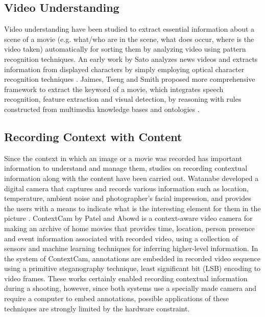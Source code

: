 \subsection{Video Understanding}

Video understanding have been studied to extract essential information about a scene of a movie (e.g. what/who are in the scene, what does occur, where is the video taken) automatically for sorting them by analyzing video using pattern recognition techniques.
An early work by Sato analyzes news videos and extracts information from displayed characters by simply employing optical character recognition techniques \cite{sato1998video}.
Jaimes, Tseng and Smith proposed more comprehensive framework to extract the keyword of a movie, which integrates speech recognition, feature extraction and visual detection, by reasoning with rules constructed from multimedia knowledge bases and ontologies \cite{jaimes2003modal}.

\subsection{Recording Context with Content}
Since the context in which an image or a movie was recorded has important information to understand and manage them, studies on recording contextual information along with the content have been carried out.
Watanabe developed a digital camera that captures and records various information such as location, temperature, ambient noise and photographer's facial impression, and provides the users with a means to indicate what is the interesting element for them in the picture \cite{Watanabe:2007:WDC:1240866.1241073}.
ContextCam by Patel and Abowd \cite{Patel04thecontextcam:} is a context-aware video camera for making an archive of home movies that provides time, location, person presence and event information associated with recorded video, using a collection of sensors and machine learning techniques for inferring higher-level information.
In the system of ContextCam, annotations are embedded in recorded video sequence using a primitive steganography technique, least significant bit (LSB) encoding to video frames.
These works certainly enabled recording contextual information during a shooting, however, since both systems use a specially made camera and require a computer to embed annotations, possible applications of these techniques are strongly limited by the hardware constraint.

